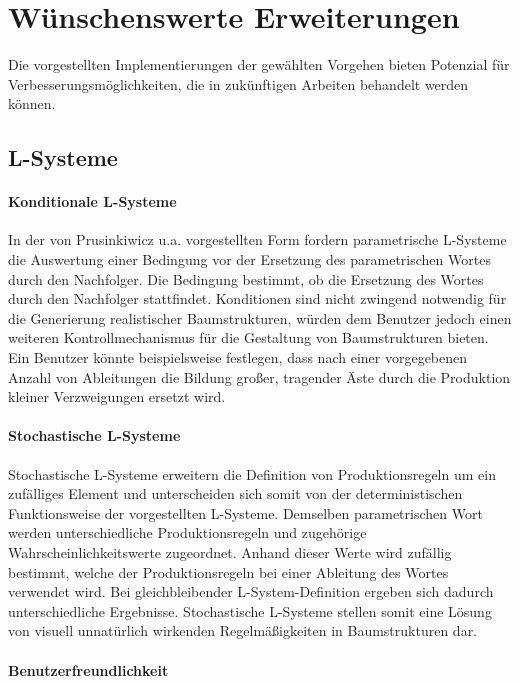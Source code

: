 \section{Wünschenswerte Erweiterungen}

Die vorgestellten Implementierungen der gewählten Vorgehen bieten Potenzial für Verbesserungsmöglichkeiten, die in zukünftigen Arbeiten behandelt werden können.

\subsection{L-Systeme}

\paragraph{Konditionale L-Systeme}

In der von Prusinkiwicz u.a. vorgestellten Form fordern parametrische L-Systeme die Auswertung einer Bedingung vor der Ersetzung des parametrischen Wortes durch den Nachfolger. Die Bedingung bestimmt, ob die Ersetzung des Wortes durch den Nachfolger stattfindet. Konditionen sind nicht zwingend notwendig für die Generierung realistischer Baumstrukturen, würden dem Benutzer jedoch einen weiteren Kontrollmechanismus für die Gestaltung von Baumstrukturen bieten. Ein Benutzer könnte beispielsweise festlegen, dass nach einer vorgegebenen Anzahl von Ableitungen die Bildung großer, tragender Äste durch die Produktion kleiner Verzweigungen ersetzt wird. \cite[S.41f]{ABOP:04}

\paragraph{Stochastische L-Systeme}

Stochastische L-Systeme erweitern die Definition von Produktionsregeln um ein zufälliges Element und unterscheiden sich somit von der deterministischen Funktionsweise der vorgestellten L-Systeme. Demselben parametrischen Wort werden unterschiedliche Produktionsregeln und zugehörige Wahrscheinlichkeitswerte zugeordnet. Anhand dieser Werte wird zufällig bestimmt, welche der Produktionsregeln bei einer Ableitung des Wortes verwendet wird. Bei gleichbleibender L-System-Definition ergeben sich dadurch unterschiedliche Ergebnisse. Stochastische L-Systeme stellen somit eine Lösung von visuell unnatürlich wirkenden Regelmäßigkeiten in Baumstrukturen dar. \cite[S.28]{ABOP:04}

\paragraph{Benutzerfreundlichkeit}

